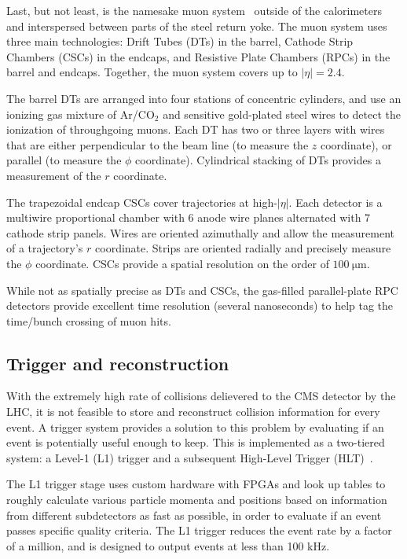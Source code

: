 Last, but not least, is the namesake muon system~\cite{CMS:Sirunyan2018fpa} outside of the calorimeters
and interspersed between parts of the steel return yoke. The muon system
uses three main technologies: Drift Tubes (DTs) in the barrel, Cathode
Strip Chambers (CSCs) in the endcaps, and Resistive Plate Chambers (RPCs)
in the barrel and endcaps. Together, the muon system covers up to $|\eta|=2.4$.

The barrel DTs are arranged into four stations of concentric cylinders,
and use an ionizing gas mixture of Ar/CO${}_2$ and sensitive gold-plated steel wires
to detect the ionization of throughgoing muons. Each DT has two or three layers
with wires that are either perpendicular to the beam line (to measure the $z$ coordinate),
or parallel (to measure the $\phi$ coordinate). Cylindrical stacking of
DTs provides a measurement of the $r$ coordinate.

The trapezoidal endcap CSCs cover trajectories at high-$|\eta|$. Each
detector is a multiwire proportional chamber with 6 anode wire planes alternated
with 7 cathode strip panels. Wires are oriented azimuthally and allow the measurement
of a trajectory's $r$ coordinate. Strips are oriented radially and precisely measure
the $\phi$ coordinate. CSCs provide a spatial resolution on the order of $100~\mathrm{\mu m}$.

While not as spatially precise as DTs and CSCs, the gas-filled parallel-plate RPC detectors provide excellent
time resolution (several nanoseconds) to help tag the time/bunch crossing of muon hits.

\subsection{Trigger and reconstruction}

With the extremely high rate of collisions delievered to the CMS detector by the LHC,
it is not feasible to store and reconstruct collision information for every event.
A trigger system provides a solution to this problem by evaluating if
an event is potentially useful enough to keep. This is implemented
as a two-tiered system: a Level-1 (L1) trigger and a subsequent High-Level Trigger (HLT)~\cite{CMS:Khachatryan2016bia}.

The L1 trigger stage uses custom hardware with FPGAs and look up tables to
roughly calculate various particle momenta and positions based
on information from different subdetectors
as fast as possible, in order to evaluate if an event passes specific quality
criteria. The L1 trigger reduces the event rate by a factor of a million, and is designed
to output events at less than 100 kHz.

